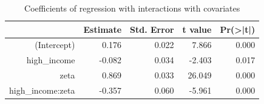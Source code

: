 \begin{table}[ht]
\centering
\begin{tabular}{rrrrr}
  \hline
 & Estimate & Std. Error & t value & Pr(>|t|) \\ 
  \hline
(Intercept) & 0.176 & 0.022 & 7.866 & 0.000 \\ 
  high\_income & -0.082 & 0.034 & -2.403 & 0.017 \\ 
  zeta & 0.869 & 0.033 & 26.049 & 0.000 \\ 
  high\_income:zeta & -0.357 & 0.060 & -5.961 & 0.000 \\ 
   \hline
\end{tabular}
\caption{Coefficients of regression with interactions with covariates} 
\label{tab:interaction-regression-exp}
\end{table}
